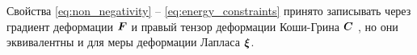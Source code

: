 Свойства \eqref{eq:non_negativity} -- \eqref{eq:energy_constraints} принято записывать через градиент деформации \(\boldsymbol{F}\) и правый тензор деформации Коши-Грина \(\boldsymbol{C}\) 
\cite{antman2005nonlin,green1839laws,kirchhoff1850gleichgewicht}, но они эквивалентны и для меры деформации Лапласа \(\boldsymbol{\xi}\).



